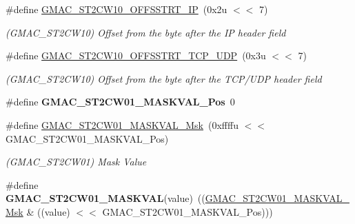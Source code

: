 \begin{DoxyCompactItemize}
\mbox{\label{group__SAMV71__GMAC_gac25177c6e329ffcc9a5a3b4b8ed6158b}} 
\#define \mbox{\hyperlink{group__SAMV71__GMAC_gac25177c6e329ffcc9a5a3b4b8ed6158b}{G\+M\+A\+C\+\_\+\+S\+T2\+C\+W10\+\_\+\+O\+F\+F\+S\+S\+T\+R\+T\+\_\+\+IP}}~(0x2u $<$$<$ 7)
\begin{DoxyCompactList}\small\item\em (G\+M\+A\+C\+\_\+\+S\+T2\+C\+W10) Offset from the byte after the IP header field \end{DoxyCompactList}\item 
\mbox{\label{group__SAMV71__GMAC_ga72684d2032380d00c3d79bac288970dd}} 
\#define \mbox{\hyperlink{group__SAMV71__GMAC_ga72684d2032380d00c3d79bac288970dd}{G\+M\+A\+C\+\_\+\+S\+T2\+C\+W10\+\_\+\+O\+F\+F\+S\+S\+T\+R\+T\+\_\+\+T\+C\+P\+\_\+\+U\+DP}}~(0x3u $<$$<$ 7)
\begin{DoxyCompactList}\small\item\em (G\+M\+A\+C\+\_\+\+S\+T2\+C\+W10) Offset from the byte after the T\+C\+P/\+U\+DP header field \end{DoxyCompactList}\item 
\mbox{\label{group__SAMV71__GMAC_ga3c04a5ea9bffca4232dbf11ec0e322ed}} 
\#define {\bfseries G\+M\+A\+C\+\_\+\+S\+T2\+C\+W01\+\_\+\+M\+A\+S\+K\+V\+A\+L\+\_\+\+Pos}~0
\item 
\mbox{\label{group__SAMV71__GMAC_gae68ea9a608305910c8556aa49821bd21}} 
\#define \mbox{\hyperlink{group__SAMV71__GMAC_gae68ea9a608305910c8556aa49821bd21}{G\+M\+A\+C\+\_\+\+S\+T2\+C\+W01\+\_\+\+M\+A\+S\+K\+V\+A\+L\+\_\+\+Msk}}~(0xffffu $<$$<$ G\+M\+A\+C\+\_\+\+S\+T2\+C\+W01\+\_\+\+M\+A\+S\+K\+V\+A\+L\+\_\+\+Pos)
\begin{DoxyCompactList}\small\item\em (G\+M\+A\+C\+\_\+\+S\+T2\+C\+W01) Mask Value \end{DoxyCompactList}\item 
\mbox{\label{group__SAMV71__GMAC_ga35e3b6fc554359b8b2d90e98f84ef1ae}} 
\#define {\bfseries G\+M\+A\+C\+\_\+\+S\+T2\+C\+W01\+\_\+\+M\+A\+S\+K\+V\+AL}(value)~((\mbox{\hyperlink{group__SAMV71__GMAC_gae68ea9a608305910c8556aa49821bd21}{G\+M\+A\+C\+\_\+\+S\+T2\+C\+W01\+\_\+\+M\+A\+S\+K\+V\+A\+L\+\_\+\+Msk}} \& ((value) $<$$<$ G\+M\+A\+C\+\_\+\+S\+T2\+C\+W01\+\_\+\+M\+A\+S\+K\+V\+A\+L\+\_\+\+Pos)))

\end{DoxyCompactItemize}
